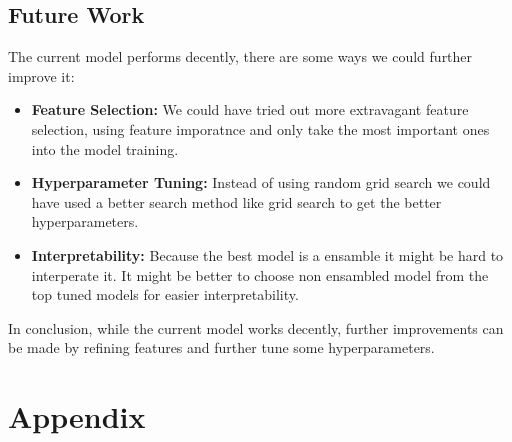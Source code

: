 \documentclass[a4paper,12pt]{article}
\begin{document}
\subsection{Future Work}
The current model performs decently, there are some ways we could further improve it:
\begin{itemize}
    \item \textbf{Feature Selection:} We could have tried out more extravagant feature selection, using feature imporatnce and only take the most important ones into the model training.
    \item \textbf{Hyperparameter Tuning:} Instead of using random grid search we could have used a better search method like grid search to get the better hyperparameters.
    \item \textbf{Interpretability:} Because the best model is a ensamble it might be hard to interperate it. It might be better to choose non ensambled model from the top tuned models for easier interpretability.
\end{itemize}

In conclusion, while the current model works decently, further improvements can be made by refining features and further tune some hyperparameters.


\clearpage

\appendix
\section*{Appendix}
\end{document}
